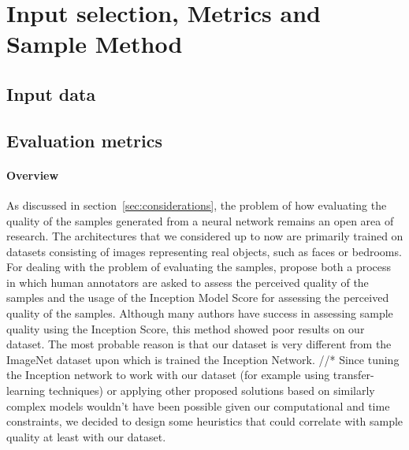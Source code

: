 

\section{Input selection, Metrics and Sample Method}
\label{sec:input_metrics_sample}
\subsection{Input data}
\label{sec:InputSelection}


\subsection{Evaluation metrics}
\label{sec:evaluation}
\paragraph{Overview} As discussed in section~\ref{sec:considerations}, the problem of how evaluating the quality of the samples generated from a neural network remains an open area of research. The architectures that we considered up to now are primarily trained on datasets consisting of images representing real objects, such as faces or bedrooms. For dealing with the problem of evaluating the samples, \citeauthor{improved_gan} propose both a process in which human annotators are asked to assess the perceived quality of the samples \cite[p.~4]{improved_gan} and the usage of the Inception Model \cite{inception} Score for assessing the perceived quality of the samples. Although many authors have success in assessing sample quality using the Inception Score, this method showed poor results on our dataset. The most probable reason is that our dataset is very different from the ImageNet dataset upon which is trained the Inception Network. //* Since tuning the Inception network to work with our dataset (for example using transfer-learning techniques) or applying other proposed solutions based on similarly complex models wouldn't have been possible given our computational and time constraints, we decided to design some heuristics that could correlate with sample quality at least with our dataset.
